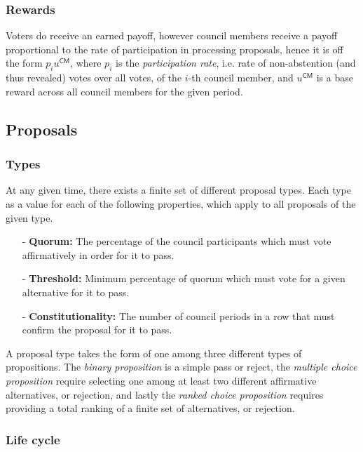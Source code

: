\documentclass{article}
\begin{document}

\subsubsection{Rewards}

Voters do receive an earned payoff, however council members receive a payoff proportional to the rate of participation in processing proposals, hence it is off the form $p_{i}u^{\mathsf{CM}}$, where $p_i$ is the \textit{participation rate}, i.e. rate of non-abstention (and thus revealed) votes over all votes, of the $i$-th council member, and $u^{\mathsf{CM}}$ is a base reward across all council members for the given period.

\subsection{Proposals}

\subsubsection{Types}

At any given time, there exists a finite set of different proposal types. Each type as a value for each of the following properties, which apply to all proposals of the given type.

\begin{itemize}
  \item[-] \textbf{Quorum:} The percentage of the council participants which must vote affirmatively in order for it to pass.
  \item[-] \textbf{Threshold:} Minimum percentage of quorum which must vote for a given alternative for it to pass.
  \item[-] \textbf{Constitutionality:} The number of council periods in a row that must confirm the proposal for it to pass.
\end{itemize}

A proposal type takes the form of one among three different types of propositions. The \textit{binary proposition} is a simple pass or reject, the \textit{multiple choice proposition} require selecting one among at least two different affirmative alternatives, or rejection, and lastly the \textit{ranked choice proposition} requires providing a total ranking of a finite set of alternatives, or rejection.

\subsubsection{Life cycle}
\end{document}
